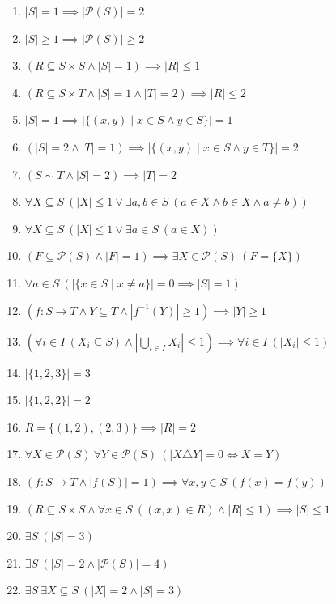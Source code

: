 \documentclass[11pt,a4paper]{article}
\begin{document}
\begin{enumerate}
\item $\displaystyle |S| = 1 \implies |\mathcal{P}(S)| = 2$
\item $\displaystyle |S| \ge 1 \implies |\mathcal{P}(S)| \ge 2$
\item $\displaystyle (R \subseteq S \times S \land |S| = 1) \implies |R| \le 1$
\item $\displaystyle (R \subseteq S \times T \land |S| = 1 \land |T| = 2) \implies |R| \le 2$
\item $\displaystyle |S| = 1 \implies |\{(x, y) \mid x \in S \land y \in S\}| = 1$
\item $\displaystyle (|S| = 2 \land |T| = 1) \implies |\{(x, y) \mid x \in S \land y \in T\}| = 2$
\item $\displaystyle (S \sim T \land |S| = 2) \implies |T| = 2$
\item $\displaystyle \forall X \subseteq S\ (|X| \le 1 \lor \exists a, b \in S\ (a \in X \land b \in X \land a \neq b))$
\item $\displaystyle \forall X \subseteq S\ (|X| \le 1 \lor \exists a \in S\ (a \in X))$
\item $\displaystyle (F \subseteq \mathcal{P}(S) \land |F| = 1) \implies \exists X \in \mathcal{P}(S)\ (F = \{X\})$
\item $\displaystyle \forall a \in S\ (|\{x \in S \mid x \neq a\}| = 0 \implies |S| = 1)$
\item $\displaystyle (f \colon S \to T \land Y \subseteq T \land |f^{-1}(Y)| \ge 1) \implies |Y| \ge 1$
\item $\displaystyle (\forall i \in I\ (X_{i} \subseteq S) \land |\bigcup_{i \in I} X_{i}| \le 1) \implies \forall i \in I\ (|X_{i}| \le 1)$
\item $\displaystyle |\{1, 2, 3\}| = 3$
\item $\displaystyle |\{1, 2, 2\}| = 2$
\item $\displaystyle R = \{(1, 2), (2, 3)\} \implies |R| = 2$
\item $\displaystyle \forall X \in \mathcal{P}(S)\ \forall Y \in \mathcal{P}(S)\ (|X \triangle Y| = 0 \iff X = Y)$
\item $\displaystyle (f \colon S \to T \land |f(S)| = 1) \implies \forall x, y \in S\ (f(x) = f(y))$
\item $\displaystyle (R \subseteq S \times S \land \forall x \in S\ ((x, x) \in R) \land |R| \le 1) \implies |S| \le 1$
\item $\displaystyle \exists S\ (|S| = 3)$
\item $\displaystyle \exists S\ (|S| = 2 \land |\mathcal{P}(S)| = 4)$
\item $\displaystyle \exists S\ \exists X \subseteq S\ (|X| = 2 \land |S| = 3)$
\end{enumerate}
\end{document}
